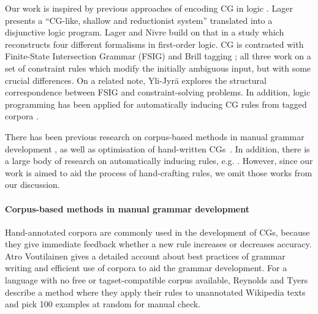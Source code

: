 


Our work is inspired by previous approaches of encoding CG in logic \cite{lager98, lager_nivre01}.
Lager \cite{lager98} presents a ``CG-like, shallow and reductionist system'' translated into a disjunctive logic program.
Lager and Nivre \cite{lager_nivre01} build on that in a study which reconstructs
four different formalisms in first-order logic. 
CG is contrasted with Finite-State Intersection Grammar (FSIG) \cite{koskenniemi90} 
and Brill tagging \cite{brill1995}; all three work on a set of constraint rules 
which modify the initially ambiguous input, but with some crucial differences.
On a related note, Yli-Jyrä \cite{yli-jyra2001} explores the structural correspondence 
between FSIG and constraint-solving problems.
In addition, logic programming has been applied for automatically inducing CG rules from tagged corpora \cite{lindberg_eineborg98ilp,asfrent14,lager01transformation}.

There has been previous research on corpus-based methods in manual grammar development \cite{voutilainen2004}, as well as optimisation of hand-written CGs~\cite{bick2013tuning}.
In addition, there is a large body of research on automatically
inducing rules, e.g. \cite{inducing_cg1996,lindberg_eineborg98ilp,lager01transformation,asfrent14}.
However, since our work is aimed to aid the process of hand-crafting rules, we omit those works from our discussion.


\paragraph{Corpus-based methods in manual grammar development}

Hand-annotated corpora are commonly used in the development of CGs, because they give immediate feedback whether a new rule increases or decreases accuracy.
Atro Voutilainen \cite{voutilainen2004} gives a detailed account about best practices of grammar writing and efficient use of corpora to aid the grammar development.
For a language with no free or tagset-compatible corpus available, Reynolds and Tyers \cite{tyers_reynolds2015} describe a method where they apply their rules to unannotated Wikipedia texts and pick 100 examples at random for manual check.

